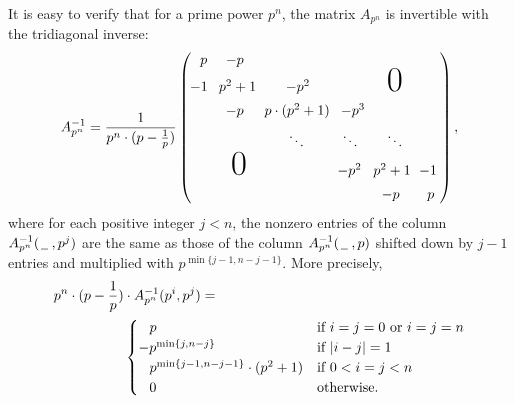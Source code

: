 \documentclass[a4paper,11pt]{amsart}
\begin{document}
It is easy to verify that for a prime power $p^n$, %
the matrix $A_{p^n}$ is invertible with the tridiagonal inverse: 
\begin{equation}
A_{p^n}^{-1}=
\frac{1}{p^{n}\cdot(p-\frac1p)}
\begin{pmatrix}
\hspace{6pt}p &\hspace*{-6pt}-p &  %
& &  & \\
\vspace{5pt}\hspace*{-1pt}-1 & \hspace*{-2pt}p^2+1 &\hspace*{-3pt}-p^2 %
& &\textnormal{\Huge 0} & \\
\vspace{5pt}&\hspace*{-6pt}-p & \hspace*{-4pt}p\cdot(p^2+1) &\hspace*{-2pt}-p^3 
 &  &  \\
 &  &\hspace*{-5pt}\ddots %
 &\hspace*{-6pt}\ddots & \ddots & \\%
\vspace{5pt}\hspace{2pt} &\textnormal{\Huge 0}  &  %
 &\hspace*{-7pt}-p^2 & \hspace*{-4pt}p^2+1 &\hspace*{-4pt}-1\hspace{2pt}\\
\hspace{2pt} &  & %
&  &\hspace*{-6pt}-p & p\hspace{2pt}
\end{pmatrix},
 \label{r1}\end{equation}
where 
for each positive integer $j<n$, 
the nonzero entries of the column  $A_{p^n}^{-1}(\un\hs,p^j)$ are the same as 
those of the column $A_{p^n}^{-1}(\un\hs,p)$ shifted down by $j-1$ entries and
multiplied with $p^{\min\{j-1,n-j-1\}}$. 
More precisely,
\begin{align}
p^{n}\cdot(p-\frac1p)&
\cdot A_{p^n}^{-1}(p^i,p^j)\nonumber=\\&\begin{cases}
                        \ \hspace{1.3pt}\ p&\text{if $i=j=0$ or $i=j=n$}\\
                        -p^{\min\{j,n-j\}}&\text{if $|i-j|=1$}\\
                        \ \hspace{1.3pt}\ p^{\min\{j-1,n-j-1\}}\cdot(p^2+1)&\text{if $0<i=j<n$}\\
                        \ \hspace{1.2pt}\ 0&\text{otherwise.}\label{r11}
\end{cases}
\end{align}
\end{document}
